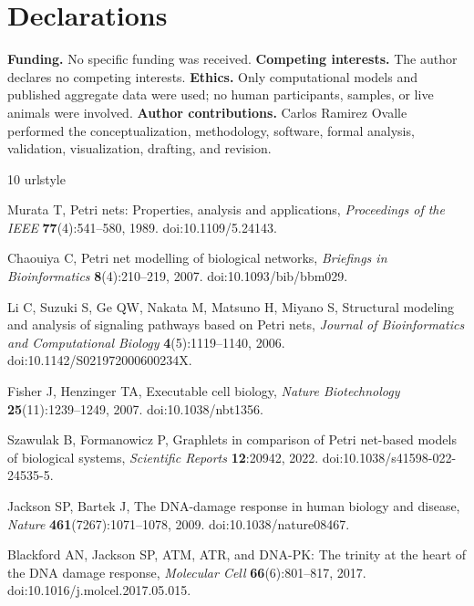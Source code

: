 \documentclass{ws-jbcb}
\numberwithin{equation}{section}
\begin{document}
\section*{Declarations}

\noindent\textbf{Funding.} No specific funding was received.
\textbf{Competing interests.} The author declares no competing interests.
\textbf{Ethics.} Only computational models and published aggregate data were
used; no human participants, samples, or live animals were involved.
\textbf{Author contributions.} Carlos Ramirez Ovalle performed the
conceptualization, methodology, software, formal analysis, validation,
visualization, drafting, and revision.

\begin{thebibliography}{10}
\providecommand{\url}[1]{\texttt{#1}}
\providecommand{\urlprefix}{URL }
\expandafter\ifx\csname urlstyle\endcsname\relax
  \providecommand{\doi}[1]{doi:\discretionary{}{}{}#1}\else
  \providecommand{\doi}{doi:\discretionary{}{}{}\begingroup
  \urlstyle{rm}\Url}\fi

Murata T, Petri nets: Properties, analysis and applications, \emph{Proceedings
  of the IEEE} \textbf{77}(4):541--580, 1989.
\newblock \doi{10.1109/5.24143}.

Chaouiya C, Petri net modelling of biological networks, \emph{Briefings in
  Bioinformatics} \textbf{8}(4):210--219, 2007.
\newblock \doi{10.1093/bib/bbm029}.

Li C, Suzuki S, Ge QW, Nakata M, Matsuno H, Miyano S, Structural modeling and
  analysis of signaling pathways based on {Petri} nets, \emph{Journal of
  Bioinformatics and Computational Biology} \textbf{4}(5):1119--1140, 2006.
\newblock \doi{10.1142/S021972000600234X}.

Fisher J, Henzinger TA, Executable cell biology, \emph{Nature Biotechnology}
  \textbf{25}(11):1239--1249, 2007.
\newblock \doi{10.1038/nbt1356}.

Szawulak B, Formanowicz P, Graphlets in comparison of {Petri} net-based models
  of biological systems, \emph{Scientific Reports} \textbf{12}:20942, 2022.
\newblock \doi{10.1038/s41598-022-24535-5}.

Jackson SP, Bartek J, The {DNA}-damage response in human biology and disease,
  \emph{Nature} \textbf{461}(7267):1071--1078, 2009.
\newblock \doi{10.1038/nature08467}.

Blackford AN, Jackson SP, {ATM}, {ATR}, and {DNA-PK}: The trinity at the heart
  of the {DNA} damage response, \emph{Molecular Cell} \textbf{66}(6):801--817,
  2017.
\newblock \doi{10.1016/j.molcel.2017.05.015}.


\end{thebibliography}
\end{document}
